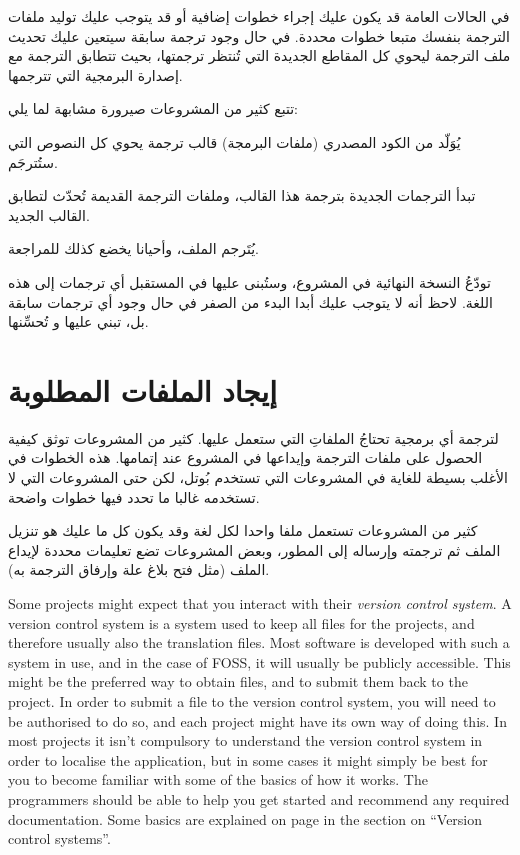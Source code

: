 في الحالات العامة قد يكون عليك إجراء خطوات إضافية أو قد يتوجب عليك توليد
ملفات الترجمة بنفسك متبعا خطوات محددة. في حال وجود ترجمة سابقة سيتعين
عليك تحديث ملف الترجمة ليحوي كل المقاطع الجديدة التي تُنتظر ترجمتها،
بحيث تتطابق الترجمة مع إصدارة البرمجية التي تترجمها.

تتبع كثير من المشروعات صيرورة مشابهة لما يلي:

  

\startitemize[1]
\item يُوَلّد من الكود المصدري (ملفات البرمجة) قالب ترجمة يحوي كل النصوص
التي ستُترجَم.
\item تبدأ الترجمات الجديدة بترجمة هذا القالب، وملفات الترجمة القديمة
تُحدّث لتطابق القالب الجديد.
\item يُتَرجم الملف، وأحيانا يخضع كذلك للمراجعة.
\item تودّعُ النسخة النهائية في المشروع، وستُبنى عليها في المستقبل أي
ترجمات إلى هذه اللغة.
\stopitemize
لاحظ أنه لا يتوجب عليك أبدا البدء من الصفر في حال وجود أي ترجمات سابقة
بل، تبني عليها و تُحسِّنها.

\section{إيجاد الملفات المطلوبة}
لترجمة أي برمجية تحتاجُ الملفاتِ التي ستعمل عليها. كثير من المشروعات
توثق كيفية الحصول على ملفات الترجمة وإيداعها في المشروع عند إتمامها.
هذه الخطوات في الأغلب بسيطة للغاية في المشروعات التي تستخدم بُوتل، لكن
حتى المشروعات التي لا تستخدمه غالبا ما تحدد فيها خطوات واضحة.

كثير من المشروعات تستعمل ملفا واحدا لكل لغة وقد يكون كل ما عليك هو تنزيل
الملف ثم ترجمته وإرساله إلى المطور، وبعض المشروعات تضع تعليمات محددة
لإيداع الملف (مثل فتح بلاغ علة وإرفاق الترجمة به).

Some projects might expect that you interact with their {\it version
control system}. A version control system is a system used to keep all
files for the projects, and therefore usually also the translation
files. Most software is developed with such a system in use, and in the
case of FOSS, it will usually be publicly accessible. This might be the
preferred way to obtain files, and to submit them back to the project.
In order to submit a file to the version control system, you will need
to be authorised to do so, and each project might have its own way of
doing this. In most projects it isn’t compulsory to understand the
version control system in order to localise the application, but in
some cases it might simply be best for you to become familiar with some
of the basics of how it works. The programmers should be able to help
you get started and recommend any required documentation. Some basics
are explained on page  in the section on
“Version control systems”.

